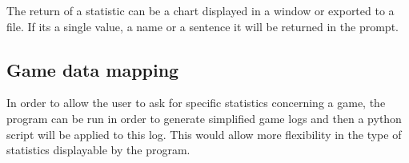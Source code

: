 \documentclass{scrreprt}
\begin{document}
The return of a statistic can be a chart displayed in a window or exported to a
file. If its a single value, a name or a sentence it will be returned in the prompt.

\subsection{Game data mapping}
In order to allow the user to ask for specific statistics concerning a game, the program can be run in order to generate simplified game logs and then a python script will be applied to this log. This would allow more flexibility in the type of statistics displayable by the program.
\end{document}
